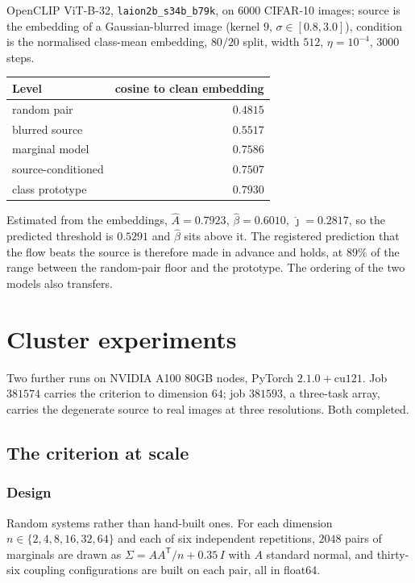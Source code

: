 \documentclass[11pt]{article}
\newcommand{\T}{\mathsf{T}}
\begin{document}
OpenCLIP ViT-B-32, \texttt{laion2b\_s34b\_b79k}, on $6000$ CIFAR-10 images; source is the
embedding of a Gaussian-blurred image (kernel $9$, $\sigma\in[0.8,3.0]$), condition is the
normalised class-mean embedding, $80/20$ split, width $512$, $\eta=10^{-4}$, $3000$ steps.

\begin{center}
\begin{tabular}{@{}lr@{}}
\toprule
Level & cosine to clean embedding\\
\midrule
random pair & $0.4815$\\
blurred source & $0.5517$\\
marginal model & $0.7586$\\
source-conditioned & $0.7507$\\
class prototype & $0.7930$\\
\bottomrule
\end{tabular}
\end{center}

Estimated from the embeddings, $\hat A=0.7923$, $\hat\beta=0.6010$, $\hat\jmath=0.2817$, so the
predicted threshold is $0.5291$ and $\hat\beta$ sits above it. The registered prediction that the
flow beats the source is therefore made in advance and holds, at $89\%$ of the range between the
random-pair floor and the prototype. The ordering of the two models also transfers.

\section{Cluster experiments}

Two further runs on NVIDIA A100 80GB nodes, PyTorch $2.1.0{+}\mathrm{cu}121$. Job $381574$
carries the criterion to dimension $64$; job $381593$, a three-task array, carries the degenerate
source to real images at three resolutions. Both completed.

\subsection{The criterion at scale}
\label{sec:thmscale}

\subsubsection*{Design}

Random systems rather than hand-built ones. For each dimension $n\in\{2,4,8,16,32,64\}$ and each
of six independent repetitions, $2048$ pairs of marginals are drawn as
$\Sigma=AA^{\T}/n+0.35\,I$ with $A$ standard normal, and thirty-six coupling configurations are
built on each pair, all in float64.
\end{document}
